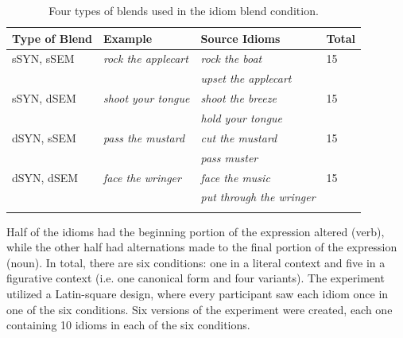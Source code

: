 \documentclass[output=paper
,modfonts
,nonflat]{langsci/langscibook}
\begin{document}
\begin{table}[h]
\begin{center}
\caption{\normalsize{Four types of blends used in the idiom blend condition.}}
\label{blendTypes}
\small{
\begin{tabular}{llll}
\lsptoprule
\bf{Type of Blend}&\textbf{Example}&\textbf{Source Idioms}&\textbf{Total}\\
\midrule
sSYN, sSEM&\textit{rock the applecart}&\textit{rock the boat}&15\\
&&\textit{upset the applecart}&\\
sSYN, dSEM&\textit{shoot your tongue}&\textit{shoot the breeze}&15\\
&&\textit{hold your tongue}&\\
dSYN, sSEM&\textit{pass the mustard}&\textit{cut the mustard}&15\\
&&\textit{pass muster}&\\
dSYN, dSEM&\textit{face the wringer}&\textit{face the music}&15\\
&&\textit{put through the wringer}&\\
\lspbottomrule
\end{tabular}
}
\end{center}
\end{table}


Half of the idioms had the beginning portion of the expression altered (verb), while the other half had alternations made to the final portion of the expression (noun). In total, there are six conditions: one in a literal context and five in a figurative context (i.e. one canonical form and four variants). The experiment utilized a Latin-square design, where every participant saw each idiom once in one of the six conditions. Six versions of the experiment were created, each one containing 10 idioms in each of the six conditions.\\
\end{document}
